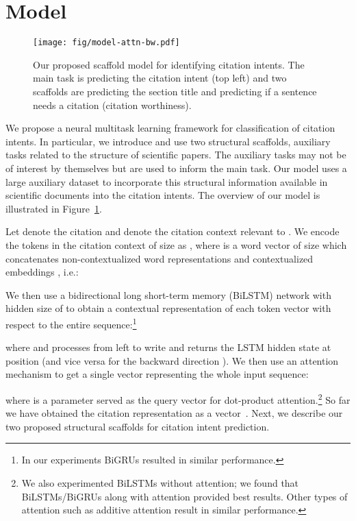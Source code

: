 \documentclass[11pt,a4paper]{article}
\begin{document}
\section{Model}
\label{sec:model}

\begin{figure}[t]
\centering
\texttt{[image: fig/model-attn-bw.pdf]}
\caption{\small{Our proposed scaffold model for identifying citation intents. The main task is predicting the citation intent (top left) and two scaffolds are predicting the section title and predicting if a sentence needs a citation (citation worthiness).}
}
\label{fig:model}
\end{figure}

We propose a neural multitask learning framework for classification of citation intents. In particular, we introduce and use two structural scaffolds, auxiliary tasks related to the structure of scientific papers.
The auxiliary tasks may not be of interest by themselves but are used to inform the main task. Our model uses a large auxiliary dataset to incorporate this structural information available in scientific documents into the citation intents. The overview of our model is illustrated in Figure~\ref{fig:model}.



Let  denote the citation and  denote the citation context relevant to .
We encode the tokens in the citation context of size  as , where  is a word vector of size  which concatenates non-contextualized word representations \cite[GloVe,][]{pennington2014glove} and contextualized embeddings \cite[ELMo,][]{Peters2018DeepCW}, i.e.:

We then use a bidirectional long short-term memory \cite{Hochreiter1997LongSM} (BiLSTM) network with hidden size of  to obtain a contextual representation of each token vector with respect to the entire sequence:\footnote{In our experiments BiGRUs resulted in similar performance.}

where  and  processes  from left to write and returns the LSTM hidden state at position  (and vice versa for the backward direction ).
We then use an attention mechanism to get a single vector representing the whole input sequence:

where  is a parameter served as the query vector for dot-product attention.\footnote{We also experimented BiLSTMs without attention; we found that BiLSTMs/BiGRUs along with attention provided best results. Other types of attention such as additive attention result in similar performance.} So far we have obtained the citation representation as a vector~. Next, we describe our two proposed structural scaffolds for citation intent prediction.
\end{document}
